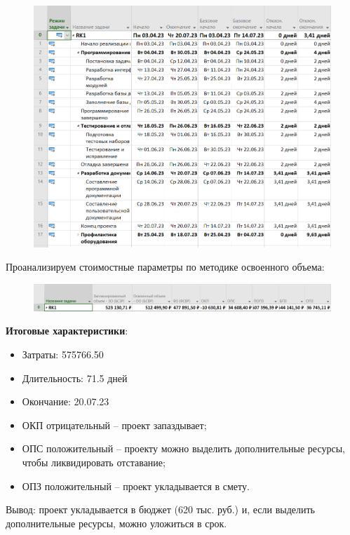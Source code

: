 \begin{figure}[H]
	\begin{center}
		\includegraphics[width=\textwidth]{imgs/task_10_9.png}
	\end{center}
\end{figure}

Проанализируем стоимостные параметры по методике освоенного объема:

\begin{figure}[H]
	\begin{center}
		\includegraphics[width=\textwidth]{imgs/task_10_10.png}
	\end{center}
\end{figure}

\textbf{Итоговые характеристики}:

\begin{itemize}
	\item Затраты: 575766.50
	\item Длительность: 71.5 дней
	\item Окончание: 20.07.23
	\item ОКП отрицательный -- проект запаздывает;
	\item ОПС положительный -- проекту можно выделить дополнительные ресурсы, чтобы ликвидировать отставание;
	\item ОПЗ положительный -- проект укладывается в смету.
\end{itemize}

Вывод: проект укладывается в бюджет (620  тыс. руб.) и, если выделить дополнительные ресурсы, можно уложиться в срок.